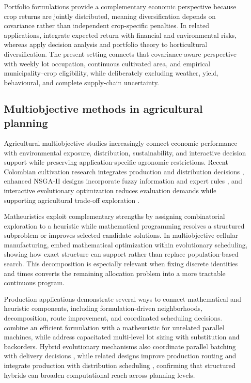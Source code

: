 \documentclass[]{interact}
\begin{document}
Portfolio formulations provide a complementary economic perspective because crop returns are jointly distributed, meaning diversification depends on covariance rather than independent crop-specific penalties. In related applications, \citet{Radulescu2014} integrate expected return with financial and environmental risks, whereas \citet{Burbano2022} apply decision analysis and portfolio theory to horticultural diversification. The present setting connects that covariance-aware perspective with weekly lot occupation, continuous cultivated area, and empirical municipality--crop eligibility, while deliberately excluding weather, yield, behavioural, and complete supply-chain uncertainty.

\subsection{Multiobjective methods in agricultural planning}

Agricultural multiobjective studies increasingly connect economic performance with environmental exposure, distribution, sustainability, and interactive decision support while preserving application-specific agronomic restrictions. Recent Colombian cultivation research integrates production and distribution decisions \citep{Vergara2025}, enhanced NSGA-II designs incorporate fuzzy information and expert rules \citep{Huang2025}, and interactive evolutionary optimization reduces evaluation demands while supporting agricultural trade-off exploration \citep{Kropp2026}.

Matheuristics exploit complementary strengths by assigning combinatorial exploration to a heuristic while mathematical programming resolves a structured subproblem or improves selected candidate solutions. In multiobjective cellular manufacturing, \citet{Hu2024} embed mathematical optimization within evolutionary scheduling, showing how exact structure can support rather than replace population-based search. This decomposition is especially relevant when fixing discrete identities and times converts the remaining allocation problem into a more tractable continuous program.

Production applications demonstrate several ways to connect mathematical and heuristic components, including formulation-driven neighborhoods, decomposition, route improvement, and coordinated scheduling decisions. \citet{Li2022} combine an efficient formulation with a matheuristic for unrelated parallel machines, while \citet{Qin2024} address capacitated multi-level lot sizing with substitution and backorders. Hybrid evolutionary mechanisms also coordinate parallel batching with delivery decisions \citep{Kucukkoc2024}, while related designs improve production routing \citep{Vadseth2023} and integrate production with distribution scheduling \citep{Vie2025}, confirming that structured hybrids can broaden computational reach across planning levels.
\end{document}
